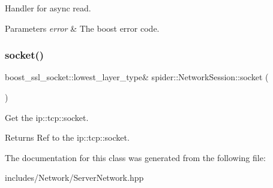 Handler for async read. 


\begin{DoxyParams}{Parameters}
{\em error} & The boost error code. \\
\hline
\end{DoxyParams}
\mbox{\label{classspider_1_1_network_session_a3a45370fb7c131566c903c3a23366a9f}} 
\subsubsection{\texorpdfstring{socket()}{socket()}}
{\footnotesize\ttfamily boost\+\_\+ssl\+\_\+socket\+::lowest\+\_\+layer\+\_\+type\& spider\+::\+Network\+Session\+::socket (\begin{DoxyParamCaption}{ }\end{DoxyParamCaption})}



Get the ip\+::tcp\+::socket. 

\begin{DoxyReturn}{Returns}
Ref to the ip\+::tcp\+::socket. 
\end{DoxyReturn}


The documentation for this class was generated from the following file\+:\begin{DoxyCompactItemize}
\item 
includes/\+Network/Server\+Network.\+hpp\end{DoxyCompactItemize}
